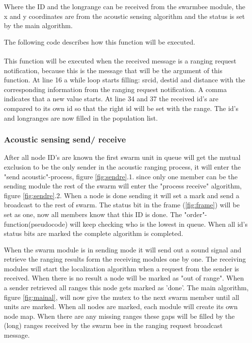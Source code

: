 \documentclass[10pt,a4paper]{article}
\begin{document}
Where the ID and the longrange can be received from the swarmbee module, the x and y coordinates are from the acoustic sensing algorithm and the status is set by the main algorithm.

The following code describes how this function will be executed.
\\\\


\vspace{5mm}
This function will be executed when the received message is a ranging request notification, because this is the message that will be the argument of this function. At line 16 a while loop starts filling: srcid, destid and distance with the corresponding information from the ranging request notification. A comma indicates that a new value starts. At line 34 and 37 the received id's are compared to its own id so that the right id will be set with the range. The id's and longranges are now filled in the population list.  

\subsubsection{Acoustic sensing send/ receive}
After all node ID's are known the first swarm unit in queue will get the mutual exclusion to be the only sender in the acoustic ranging process, it will enter the "send acoustic"-process, figure \ref{fig:sendre}.1. since only one member can be the sending module the rest of the swarm will enter the "process receive" algorithm, figure \ref{fig:sendre}.2. When a node is done sending it will set a mark and send a broadcast to the rest of swarm. The status bit in the frame (\ref{fig:frame}) will be set as one, now all members know that this ID is done. The "order"-function(pseudocode) will keep checking who is the lowest in queue. When all id's status bits are marked the complete algorithm is completed.
\newpage



When the swarm module is in sending mode it will send out a sound signal and retrieve the ranging results form the receiving modules one by one. The receiving modules will start the localization algorithm when a request from the sender is received. When there is no result a node will be marked as "out of range". When a sender retrieved all ranges this node gets marked as 'done'. The main algorithm, figure \ref{fig:mainal}, will now give the mutex to the next swarm member until all units are marked. When all nodes are marked, each module will create its own node map. When there are any missing ranges these gaps will be filled by the (long) ranges received by the swarm bee in the ranging request broadcast message.
\end{document}
